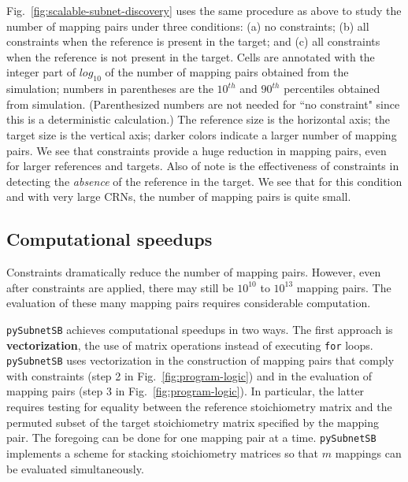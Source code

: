 \documentclass[webpdf,contemporary,large]{oup-authoring-template}
\newcommand{\fig}[1]{
  Fig.~\ref{#1}}
\newcommand{\py}{\texttt{pySubnetSB}}
\theoremstyle{thmstyleone}%
\theoremstyle{thmstyletwo}%
\theoremstyle{thmstylethree}%
\begin{document}
\fig{fig:scalable-subnet-discovery} uses the same procedure as above to study the number of mapping pairs under three conditions: (a) no constraints; (b) all constraints when the reference is present in the target; and (c) all constraints when the reference is not present in the target.
Cells are annotated with the integer part of $log_{10}$ of the number of mapping pairs obtained from the simulation; numbers in parentheses are the $10^{th}$ and $90^{th}$ percentiles obtained from simulation.
(Parenthesized numbers are not needed for ``no constraint" since this is
a deterministic calculation.)
The reference size is the horizontal axis; the target size is the vertical axis; darker colors indicate a larger number of mapping pairs.
We see that constraints provide a huge reduction in mapping pairs, even for larger references and targets.
Also of note is the effectiveness of constraints in detecting the {\em absence} of the reference in the target.
We see that for this condition and with very large CRNs, the number of mapping pairs is quite small.
    
\subsection{Computational speedups}\label{sec:parallelism}
Constraints dramatically reduce the number of mapping pairs. 
However, even after constraints are applied, there may still be $10^{10}$ to $10^{13}$ mapping pairs.
The evaluation of these many mapping pairs requires considerable computation.

\py{} achieves computational speedups in two ways.
The first approach is {\bf vectorization}, the use of matrix operations instead of executing \texttt{for} loops.
\py{} uses vectorization in the construction of mapping pairs
that comply with constraints
(step 2 in \fig{fig:program-logic})
and in the evaluation of mapping pairs
(step 3 in \fig{fig:program-logic}).
In particular,
the latter requires testing for equality between the reference stoichiometry matrix and the permuted subset of the target stoichiometry matrix specified by the mapping pair.
The foregoing can be done for one mapping pair at a time.
\py{} implements a scheme for stacking stoichiometry matrices so that $m$ mappings can be evaluated simultaneously.
\end{document}
